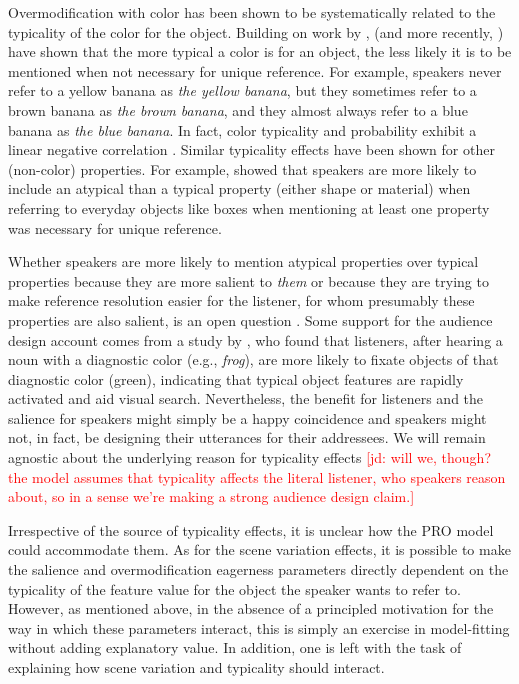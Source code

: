 \documentclass[11pt]{article}
\newcommand{\jd}[1]{\textcolor{Red}{[jd: #1]}}
\begin{document}
Overmodification with color has been shown to be systematically related to the typicality of the color for the object. Building on work by ,  (and more recently, ) have shown that the more typical a color is for an object, the less likely it is to be mentioned when not necessary for unique reference. For example, speakers never refer to a yellow banana as \emph{the yellow banana}, but they sometimes refer to a brown banana as \emph{the brown banana}, and they almost always refer to a blue banana as \emph{the blue banana}. In fact, color typicality and probability exhibit a linear negative correlation \cite{Westerbeek2015}. Similar typicality effects have been shown for other (non-color) properties. For example,  showed that speakers are more likely to include an atypical than a typical property (either shape or material) when referring to everyday objects like boxes when mentioning at least one property was necessary for unique reference. %

Whether speakers are more likely to mention atypical properties over typical properties because they are more salient to \emph{them} or because they are trying to make reference resolution easier for the listener, for whom presumably these properties are also salient, is an open question \cite{Westerbeek2015}. Some support for the audience design account comes from a study by , who found that listeners, after hearing a noun with a diagnostic color (e.g., \emph{frog}), are more likely to fixate objects of that diagnostic color (green), indicating that typical object features are rapidly activated and aid visual search. Nevertheless, the benefit for listeners and the salience for speakers might simply be a happy coincidence and speakers might not, in fact, be designing their utterances for their addressees. We will remain agnostic about the underlying reason for typicality effects \jd{will we, though? the model assumes that typicality affects the literal listener, who speakers reason about, so in a sense we're making a strong audience design claim.}

Irrespective of the source of typicality effects, it is unclear how the PRO model could accommodate them. As for the scene variation effects, it is possible to make the salience and overmodification eagerness parameters directly dependent on the typicality of the feature value for the object the speaker wants to refer to. However, as mentioned above, in the absence of a principled motivation for the way in which these parameters interact, this is simply an exercise in model-fitting without adding explanatory value. In addition, one is left with the task of explaining how scene variation and typicality should interact. 
\end{document}
